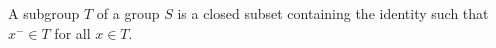 A subgroup $T$ of a group $S$ is a closed subset containing the identity such that $x^{-} \in T$ for all $x \in T$.
